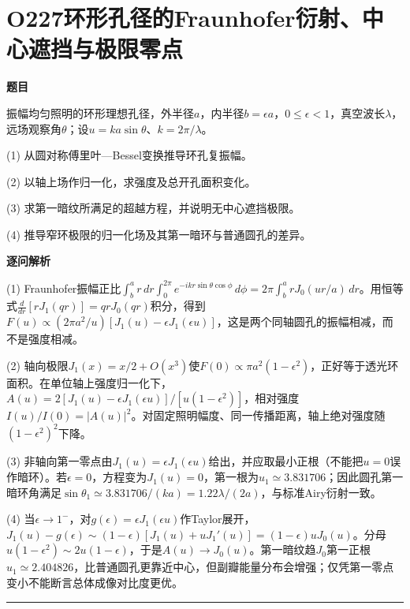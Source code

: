 \documentclass[UTF8,a4paper,11pt,oneside,openany]{ctexbook}
\begin{document}
\section*{O227\quad 环形孔径的Fraunhofer衍射、中心遮挡与极限零点}
\textbf{题目}\par
振幅均匀照明的环形理想孔径，外半径$a$，内半径$b=\epsilon a$，$0\le\epsilon<1$，真空波长$\lambda$，远场观察角$\theta$；设$u=ka\sin\theta$、$k=2\pi/\lambda$。
\par\smallskip\noindent (1) 从圆对称傅里叶—Bessel变换推导环孔复振幅。
\par\smallskip\noindent (2) 以轴上场作归一化，求强度及总开孔面积变化。
\par\smallskip\noindent (3) 求第一暗纹所满足的超越方程，并说明无中心遮挡极限。
\par\smallskip\noindent (4) 推导窄环极限的归一化场及其第一暗环与普通圆孔的差异。
\par\medskip\textbf{逐问解析}\par
\par\smallskip\noindent (1) Fraunhofer振幅正比$\int_b^a r\,dr\int_0^{2\pi}e^{-ikr\sin\theta\cos\phi}\,d\phi=2\pi\int_b^a rJ_0(ur/a)\,dr$。用恒等式$\frac{d}{dr}[rJ_1(qr)]=qrJ_0(qr)$积分，得到$F(u)\propto (2\pi a^2/u)[J_1(u)-\epsilon J_1(\epsilon u)]$，这是两个同轴圆孔的振幅相减，而不是强度相减。
\par\smallskip\noindent (2) 轴向极限$J_1(x)=x/2+O(x^3)$使$F(0)\propto\pi a^2(1-\epsilon^2)$，正好等于透光环面积。在单位轴上强度归一化下，$A(u)=2[J_1(u)-\epsilon J_1(\epsilon u)]/[u(1-\epsilon^2)]$，相对强度$I(u)/I(0)=|A(u)|^2$。对固定照明幅度、同一传播距离，轴上绝对强度随$(1-\epsilon^2)^2$下降。
\par\smallskip\noindent (3) 非轴向第一零点由$J_1(u)=\epsilon J_1(\epsilon u)$给出，并应取最小正根（不能把$u=0$误作暗环）。若$\epsilon=0$，方程变为$J_1(u)=0$，第一根为$u_1\simeq3.831706$；因此圆孔第一暗环角满足$\sin\theta_1\simeq3.831706/(ka)=1.22\lambda/(2a)$，与标准Airy衍射一致。
\par\smallskip\noindent (4) 当$\epsilon\to1^-$，对$g(\epsilon)=\epsilon J_1(\epsilon u)$作Taylor展开，$J_1(u)-g(\epsilon)\sim(1-\epsilon)[J_1(u)+uJ_1'(u)]=(1-\epsilon)uJ_0(u)$。分母$u(1-\epsilon^2)\sim2u(1-\epsilon)$，于是$A(u)\to J_0(u)$。第一暗纹趋$J_0$第一正根$u_1\simeq2.404826$，比普通圆孔更靠近中心，但副瓣能量分布会增强；仅凭第一零点变小不能断言总体成像对比度更优。
\par\medskip\hrule\medskip
\end{document}
